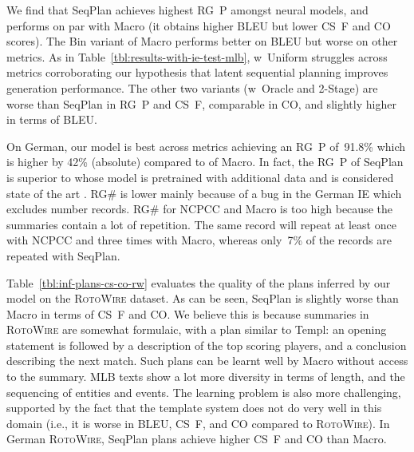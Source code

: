 We find that SeqPlan achieves highest RG~P amongst neural models, and
performs on par with Macro (it obtains higher BLEU but lower CS~F and
CO scores).  The Bin variant of Macro performs better on BLEU but
worse on other metrics.  As in
Table~\ref{tbl:results-with-ie-test-mlb}, w~Uniform struggles across
metrics corroborating our hypothesis that latent sequential planning
improves generation performance.  The other two variants (w~Oracle and
2-Stage) are worse than SeqPlan in RG~P and CS~F, comparable in
CO, and slightly higher in terms of BLEU.

On German, our model is best across metrics achieving an RG~P
of~91.8\% which is higher by 42\% (absolute) compared to of Macro. In
fact, the RG~P of SeqPlan is superior to
\citet{saleh-etal-2019-naver} whose model is pretrained with
additional data and is considered state of the art
\cite{hayashi-etal-2019-findings}.  RG\# is lower mainly because of a
bug in the German IE which excludes number records. RG\# for NCPCC
and Macro is too high because the summaries contain a lot of
repetition.  The same record will repeat at least once with NCPCC
and three times with Macro, whereas only~7\% of the records are
repeated with SeqPlan. 

Table~\ref{tbl:inf-plans-cs-co-rw} evaluates the quality of the plans
inferred by our model on the \textsc{RotoWire} dataset. As can be
seen, SeqPlan is slightly worse than Macro in terms of CS~F and CO. We
believe this is because summaries in \textsc{RotoWire} are somewhat
formulaic, with a plan similar to Templ: an opening statement is
followed by a description of the top scoring players, and a conclusion
describing the next match. Such plans can be learnt well by Macro
without access to the summary. MLB texts show a lot more diversity in
terms of length, and the sequencing of entities and events. The
learning problem is also more challenging, supported by the fact that
the template system does not do very well in this domain (i.e., it is
worse in BLEU, CS~F, and CO compared to \textsc{RotoWire}).  In German
\textsc{RotoWire}, SeqPlan plans achieve higher CS~F and CO than
Macro.


